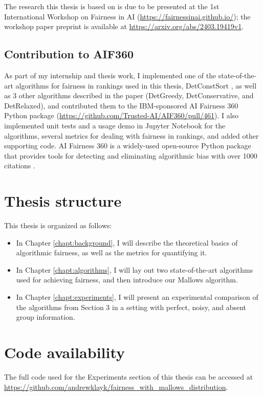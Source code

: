 The research this thesis is based on is due to be presented at the 1st International Workshop on Fairness in AI (\url{https://fairnessinai.github.io/}); the workshop paper preprint is available at \url{https://arxiv.org/abs/2403.19419v1}.

\subsection{Contribution to AIF360}

As part of my internship and thesis work, I implemented one of the state-of-the-art algorithms for fairness in rankings used in this thesis, DetConstSort \cite{linkedin}, as well as 3 other algorithms described in the paper (DetGreedy, DetConservative, and DetRelaxed), and contributed them to the IBM-sponsored AI Fairness 360 Python package (\url{https://github.com/Trusted-AI/AIF360/pull/461}). I also implemented unit tests and a usage demo in Jupyter Notebook for the algorithms, several metrics for dealing with fairness in rankings, and added other supporting code. AI Fairness 360 is a widely-used open-source Python package that provides tools for detecting and eliminating algorithmic bias with over 1000 citations \cite{8843908}.

\section{Thesis structure}\label{sect:structure}

This thesis is organized as follows:

\begin{itemize}
\item In Chapter \ref{chapt:background}, I will describe the theoretical basics of algorithmic fairness, as well as the metrics for quantifying it.
\item In Chapter \ref{chapt:algorithms}, I will lay out two state-of-the-art algorithms used for achieving fairness, and then introduce our Mallows algorithm.
\item In Chapter \ref{chapt:experiments}, I will present an experimental comparison of the algorithms from Section 3 in a setting with perfect, noisy, and absent group information.
\end{itemize}


\section{Code availability}\label{sect:code_availability}

The full code used for the Experiments section of this thesis can be accessed at \url{https://github.com/andrewklayk/fairness_with_mallows_distribution}.
